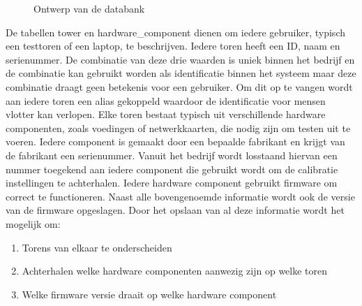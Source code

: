 \begin{figure}[!ht]
\centering
{}
\caption{Ontwerp van de databank}
\label{fig:databank}
\end{figure}

De tabellen tower en hardware\_component dienen om iedere gebruiker, typisch een testtoren of een laptop, te beschrijven.
Iedere toren heeft een ID, naam en serienummer.
De combinatie van deze drie waarden is uniek binnen het bedrijf en de combinatie kan gebruikt worden als identificatie binnen het systeem maar deze combinatie draagt geen betekenis voor een gebruiker.
Om dit op te vangen wordt aan iedere toren een alias gekoppeld waardoor de identificatie voor mensen vlotter kan verlopen.
Elke toren bestaat typisch uit verschillende hardware componenten, zoals voedingen of netwerkkaarten, die nodig zijn om testen uit te voeren.
Iedere component is gemaakt door een bepaalde fabrikant en krijgt van de fabrikant een serienummer.
Vanuit het bedrijf wordt losstaand hiervan een nummer toegekend aan iedere component die gebruikt wordt om de calibratie instellingen te achterhalen.
Iedere hardware component gebruikt firmware om correct te functioneren.
Naast alle bovengenoemde informatie wordt ook de versie van de firmware opgeslagen.
Door het opslaan van al deze informatie wordt het mogelijk om:
\begin{enumerate}
\item Torens van elkaar te onderscheiden
\item Achterhalen welke hardware componenten aanwezig zijn op welke toren
\item Welke firmware versie draait op welke hardware component
\end{enumerate}

